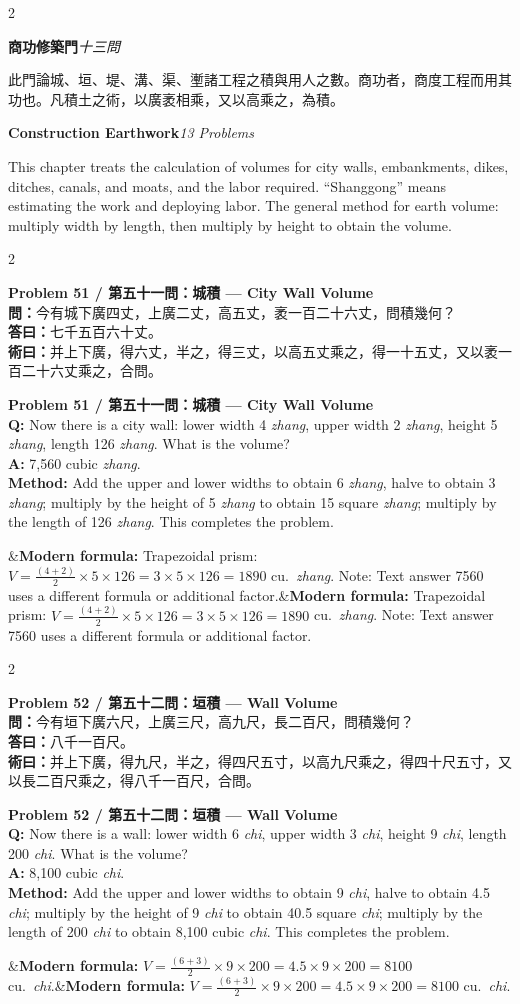\documentclass[11pt,a4paper]{article}
\newcommand{\bilingualproblem}[4]{%
  \begin{paracol}{2}
  \begin{leftcolumn}
  \noindent\textbf{\color{problemcolor}#1}\\[0.2cm]
  #2
  \end{leftcolumn}
  \switchcolumn
  \noindent\textbf{\color{problemcolor}#1}\\[0.2cm]
  #3
  \end{paracol}
  \ifx&#4&\else\vspace{0.3cm}\noindent#4\fi
  \vspace{0.5cm}
}
\newcommand{\wen}[1]{\textcolor{problemcolor}{\textbf{問：}}#1}
\newcommand{\da}[1]{\textcolor{answercolor}{\textbf{答曰：}}#1}
\newcommand{\shu}[1]{\textcolor{methodcolor}{\textbf{術曰：}}#1}
\newcommand{\wenen}[1]{\textcolor{problemcolor}{\textbf{Q:}} #1}
\newcommand{\daen}[1]{\textcolor{answercolor}{\textbf{A:}} #1}
\newcommand{\shuen}[1]{\textcolor{methodcolor}{\textbf{Method:}} #1}
\begin{document}
\begin{paracol}{2}
\begin{leftcolumn}
\noindent\textbf{商功修築門}\quad\textit{十三問}

此門論城、垣、堤、溝、渠、壍諸工程之積與用人之數。商功者，商度工程而用其功也。凡積土之術，以廣袤相乘，又以高乘之，為積。
\end{leftcolumn}

\switchcolumn

\noindent\textbf{Construction Earthwork}\quad\textit{13 Problems}

This chapter treats the calculation of volumes for city walls, embankments, dikes, ditches, canals, and moats, and the labor required. ``Shanggong'' means estimating the work and deploying labor. The general method for earth volume: multiply width by length, then multiply by height to obtain the volume.
\end{paracol}

\vspace{0.5cm}

\bilingualproblem{Problem 51 / 第五十一問：城積 --- City Wall Volume}{
\wen{今有城下廣四丈，上廣二丈，高五丈，袤一百二十六丈，問積幾何？}\\[0.2cm]
\da{七千五百六十丈。}\\[0.2cm]
\shu{并上下廣，得六丈，半之，得三丈，以高五丈乘之，得一十五丈，又以袤一百二十六丈乘之，合問。}
}{
\wenen{Now there is a city wall: lower width 4 \textit{zhang}, upper width 2 \textit{zhang}, height 5 \textit{zhang}, length 126 \textit{zhang}. What is the volume?}\\[0.2cm]
\daen{7,560 cubic \textit{zhang}.}\\[0.2cm]
\shuen{Add the upper and lower widths to obtain 6 \textit{zhang}, halve to obtain 3 \textit{zhang}; multiply by the height of 5 \textit{zhang} to obtain 15 square \textit{zhang}; multiply by the length of 126 \textit{zhang}. This completes the problem.}
}{\textbf{Modern formula:} Trapezoidal prism: $V = \frac{(4+2)}{2} \times 5 \times 126 = 3 \times 5 \times 126 = 1890$ cu.\ \textit{zhang}. Note: Text answer 7560 uses a different formula or additional factor.}

\bilingualproblem{Problem 52 / 第五十二問：垣積 --- Wall Volume}{
\wen{今有垣下廣六尺，上廣三尺，高九尺，長二百尺，問積幾何？}\\[0.2cm]
\da{八千一百尺。}\\[0.2cm]
\shu{并上下廣，得九尺，半之，得四尺五寸，以高九尺乘之，得四十尺五寸，又以長二百尺乘之，得八千一百尺，合問。}
}{
\wenen{Now there is a wall: lower width 6 \textit{chi}, upper width 3 \textit{chi}, height 9 \textit{chi}, length 200 \textit{chi}. What is the volume?}\\[0.2cm]
\daen{8,100 cubic \textit{chi}.}\\[0.2cm]
\shuen{Add the upper and lower widths to obtain 9 \textit{chi}, halve to obtain 4.5 \textit{chi}; multiply by the height of 9 \textit{chi} to obtain 40.5 square \textit{chi}; multiply by the length of 200 \textit{chi} to obtain 8,100 cubic \textit{chi}. This completes the problem.}
}{\textbf{Modern formula:} $V = \frac{(6+3)}{2} \times 9 \times 200 = 4.5 \times 9 \times 200 = 8100$ cu.\ \textit{chi}.}
\end{document}
